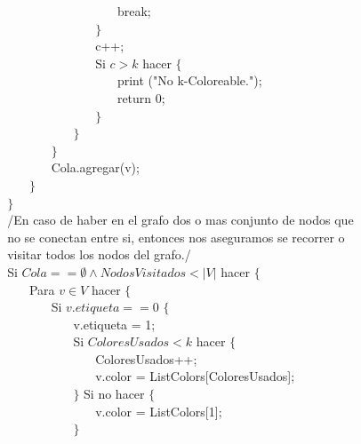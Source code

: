 \documentclass[a4paper,12pt]{article}
\begin{document}
$~~~~~~~~~~~~~~~~~~~~~~~~~~~~~~~~~~~~~~~~~~~~~~~~~~~~~~~~$ break;\\
$~~~~~~~~~~~~~~~~~~~~~~~~~~~~~~~~~~~~~~~~~~~~~~~~$ $\}$\\
$~~~~~~~~~~~~~~~~~~~~~~~~~~~~~~~~~~~~~~~~~~~~~~~~$ c++;\\
$~~~~~~~~~~~~~~~~~~~~~~~~~~~~~~~~~~~~~~~~~~~~~~~~$ Si $c > k$ hacer $\{$ \\
$~~~~~~~~~~~~~~~~~~~~~~~~~~~~~~~~~~~~~~~~~~~~~~~~~~~~~~~~$ print ("No {k}-Coloreable.");\\
$~~~~~~~~~~~~~~~~~~~~~~~~~~~~~~~~~~~~~~~~~~~~~~~~~~~~~~~~$ return 0; \\	
$~~~~~~~~~~~~~~~~~~~~~~~~~~~~~~~~~~~~~~~~~~~~~~~~$ $\}$\\
$~~~~~~~~~~~~~~~~~~~~~~~~~~~~~~~~~~~~~~~~$ $\}$	\\
$~~~~~~~~~~~~~~~~~~~~~~~~~~~~~~~~$ $\}$\\
$~~~~~~~~~~~~~~~~~~~~~~~~~~~~~~~~$ Cola.agregar(v);\\
$~~~~~~~~~~~~~~~~~~~~~~~~$ $\}$\\
$~~~~~~~~~~~~~~~~$ $\}$\\
$~~~~~~~~~~~~~~~~$ /En caso de haber en el grafo dos o mas conjunto de nodos que\\
$~~~~~~~~~~~~~~~~$ no se conectan entre si, entonces nos aseguramos se recorrer o\\ 
$~~~~~~~~~~~~~~~~$ visitar todos los nodos del grafo./ \\
$~~~~~~~~~~~~~~~~$ Si $Cola == \emptyset \land NodosVisitados < |V|$ hacer $\{$ \\
$~~~~~~~~~~~~~~~~~~~~~~~~$ Para $v \in V$ hacer $\{$ \\
$~~~~~~~~~~~~~~~~~~~~~~~~~~~~~~~~$ Si $v.etiqueta == 0$ $\{$ \\
$~~~~~~~~~~~~~~~~~~~~~~~~~~~~~~~~~~~~~~~~$ v.etiqueta = 1;\\
$~~~~~~~~~~~~~~~~~~~~~~~~~~~~~~~~~~~~~~~~$ Si $ColoresUsados < k$ hacer $\{$ \\
$~~~~~~~~~~~~~~~~~~~~~~~~~~~~~~~~~~~~~~~~~~~~~~~~$ ColoresUsados++; \\
$~~~~~~~~~~~~~~~~~~~~~~~~~~~~~~~~~~~~~~~~~~~~~~~~$ v.color = ListColors[ColoresUsados];\\
$~~~~~~~~~~~~~~~~~~~~~~~~~~~~~~~~~~~~~~~~$ $\}$ Si no hacer $\{$ \\
$~~~~~~~~~~~~~~~~~~~~~~~~~~~~~~~~~~~~~~~~~~~~~~~~$ v.color = ListColors[1];\\
$~~~~~~~~~~~~~~~~~~~~~~~~~~~~~~~~~~~~~~~~$ $\}$ \\
\end{document}
